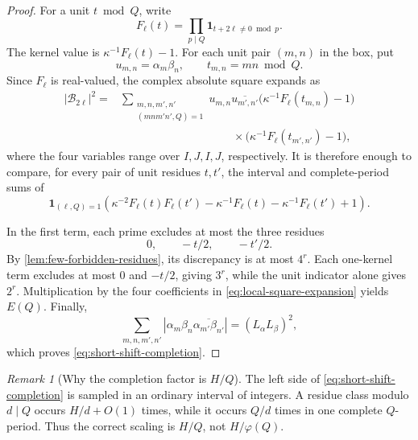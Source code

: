 \documentclass[11pt]{article}
\theoremstyle{definition}
\theoremstyle{remark}
\newtheorem{remark}[theorem]{Remark}
\newcommand{\one}{\mathbf 1}
\newcommand{\cB}{\mathcal B}
\begin{document}
\begin{proof}
For a unit $t\bmod Q$, write
\[
 F_\ell(t)=\prod_{p\mid Q}\one_{t+2\ell\ne0\bmod p}.
\]
The kernel value is $\kappa^{-1}F_\ell(t)-1$.  For each unit pair $(m,n)$ in the box, put
\[
 u_{m,n}=\alpha_m\beta_n,
 \qquad t_{m,n}=mn\bmod Q.
\]
Since $F_\ell$ is real-valued, the complex absolute square expands as
\begin{align*}
 |\cB_{2\ell}|^2
 ={}&\sum_{\substack{m,n,m',n'\\(mnm'n',Q)=1}}
 u_{m,n}\overline{u_{m',n'}}
 \bigl(\kappa^{-1}F_\ell(t_{m,n})-1\bigr)\\
 &\hspace{10em}\times
 \bigl(\kappa^{-1}F_\ell(t_{m',n'})-1\bigr),
\end{align*}
where the four variables range over $I,J,I,J$, respectively.  It is therefore enough to compare, for every pair of unit residues $t,t'$, the interval and complete-period sums of
\begin{equation}\label{eq:local-square-expansion}
 \one_{(\ell,Q)=1}
 \left(
  \kappa^{-2}F_\ell(t)F_\ell(t')
  -\kappa^{-1}F_\ell(t)
  -\kappa^{-1}F_\ell(t')+1
 \right).
\end{equation}

In the first term, each prime excludes at most the three residues
\[
 0,\qquad -t/2,\qquad -t'/2.
\]
By \cref{lem:few-forbidden-residues}, its discrepancy is at most $4^r$.  Each one-kernel term excludes at most $0$ and $-t/2$, giving $3^r$, while the unit indicator alone gives $2^r$.  Multiplication by the four coefficients in \eqref{eq:local-square-expansion} yields $E(Q)$.  Finally,
\[
 \sum_{m,n,m',n'}
 |\alpha_m\beta_n\overline{\alpha_{m'}\beta_{n'}}|
 =(L_\alpha L_\beta)^2,
\]
which proves \eqref{eq:short-shift-completion}.
\end{proof}

\begin{remark}[Why the completion factor is $H/Q$]\label{rem:h-over-q}
The left side of \eqref{eq:short-shift-completion} is sampled in an ordinary interval of integers.  A residue class modulo $d\mid Q$ occurs $H/d+O(1)$ times, while it occurs $Q/d$ times in one complete $Q$-period.  Thus the correct scaling is $H/Q$, not $H/\varphi(Q)$.
\end{remark}
\end{document}
